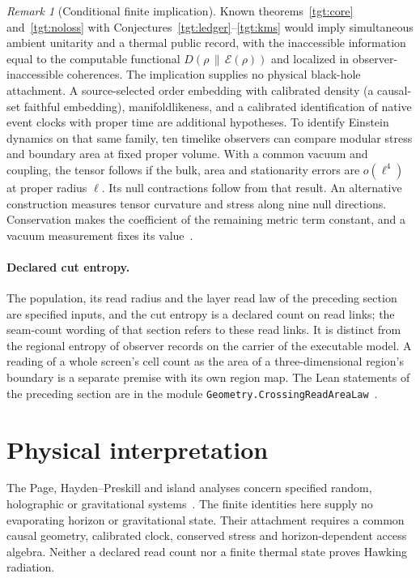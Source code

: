 \documentclass[11pt]{article}
\theoremstyle{remark}
\newtheorem{remark}[theorem]{Remark}
\newcommand{\KL}[2]{D\!\left(#1\,\middle\|\,#2\right)}
\begin{document}
\begin{remark}[Conditional finite implication]
Known theorems~\ref{tgt:core} and~\ref{tgt:noloss} with Conjectures~\ref{tgt:ledger}--\ref{tgt:kms} would imply simultaneous ambient
unitarity and a thermal public record, with the inaccessible information equal
to the computable functional $\KL{\rho}{\mathcal E(\rho)}$ and localized in
observer-inaccessible coherences. The implication supplies no physical
black-hole attachment. A source-selected order embedding with calibrated
density (a causal-set faithful embedding), manifoldlikeness, and a
calibrated identification of native event clocks with proper time are
additional hypotheses. To identify Einstein dynamics on that same
family, ten timelike observers can compare modular stress and boundary
area at fixed proper volume. With a common vacuum and coupling, the
tensor follows if the bulk, area and stationarity errors are
$o(\ell^4)$ at proper radius $\ell$. Its null contractions follow from
that result. An alternative construction measures tensor curvature
and stress along nine null directions. Conservation makes the
coefficient of the remaining metric term constant, and a vacuum
measurement fixes its value~\cite{ophEinstein}.
\end{remark}



\paragraph{Declared cut entropy.}
The population, its read radius and the layer read law of the preceding
section are specified inputs, and the cut entropy is a declared count on
read links; the seam-count wording of that section refers to these read
links. It is distinct from the regional entropy of observer records on the
carrier of the executable model. A reading of a whole screen's cell count as
the area of a three-dimensional region's boundary is a separate premise with
its own region map. The
Lean statements of the preceding section are in the module
\texttt{Geometry.CrossingReadAreaLaw}~\cite{ophlean}.

\section{Physical interpretation}
The Page, Hayden--Preskill and island analyses concern specified random,
holographic or gravitational systems~\cite{page1993,haydenpreskill,islands}.
The finite identities here supply no evaporating horizon or gravitational
state. Their attachment requires a common causal geometry, calibrated clock,
conserved stress and horizon-dependent access algebra. Neither a declared
read count nor a finite thermal state proves Hawking radiation.
\end{document}
